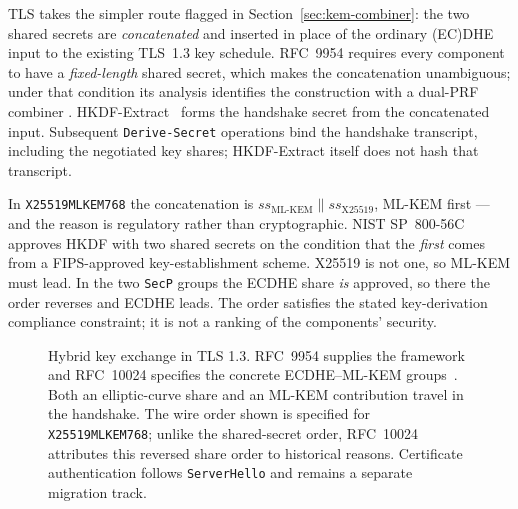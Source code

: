 TLS takes the simpler route flagged in Section~\ref{sec:kem-combiner}: the two
shared secrets are \emph{concatenated} and inserted in place of the ordinary
(EC)DHE input to the existing TLS~1.3 key schedule. RFC~9954 requires every
component to have a \emph{fixed-length} shared secret, which makes the
concatenation unambiguous; under that condition its analysis identifies the
construction with a dual-PRF combiner \cite{rfc9954}. HKDF-Extract~\cite{rfc5869}
forms the handshake secret from the concatenated input. Subsequent
\texttt{Derive-Secret} operations bind the handshake transcript, including the
negotiated key shares; HKDF-Extract itself does not hash that transcript.

\begin{remark}
In \texttt{X25519MLKEM768} the concatenation is $ss_{\text{ML-KEM}} \|
ss_{\text{X25519}}$, ML-KEM first --- and the reason is regulatory rather than
cryptographic. NIST SP~800-56C approves HKDF with two shared secrets on the
condition that the \emph{first} comes from a FIPS-approved key-establishment
scheme. X25519 is not one, so ML-KEM must lead. In the two \texttt{SecP} groups
the ECDHE share \emph{is} approved, so there the order reverses and ECDHE leads.
The order satisfies the stated key-derivation compliance constraint; it is not a
ranking of the components' security.
\end{remark}

\begin{figure}[H]
\centering
{}
\caption{Hybrid key exchange in TLS 1.3. RFC~9954 supplies the framework and
RFC~10024 specifies the concrete ECDHE--ML-KEM groups~\cite{rfc9954,rfc10024}.
Both an elliptic-curve share and an ML-KEM contribution travel in the handshake.
The wire order shown is specified for \texttt{X25519MLKEM768}; unlike the
shared-secret order, RFC~10024 attributes this reversed share order to historical
reasons. Certificate authentication follows \texttt{ServerHello} and remains a
separate migration track.}
\label{fig:tls-hybrid}
\end{figure}

